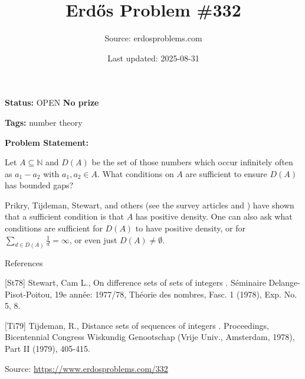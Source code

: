 \documentclass{article}
\title{Erd\H{o}s Problem \#332}
\date{Last updated: 2025-08-31}
\author{Source: erdosproblems.com}
\begin{document}
\maketitle

\noindent\textbf{Status:} OPEN \quad \textbf{No prize}

\noindent\textbf{Tags:} number theory

\medskip

\noindent\textbf{Problem Statement:}

Let $A\subseteq \mathbb{N}$ and $D(A)$ be the set of those numbers which occur infinitely often as $a_1-a_2$ with $a_1,a_2\in A$. What conditions on $A$ are sufficient to ensure $D(A)$ has bounded gaps?




Prikry, Tijdeman, Stewart, and others (see the survey articles \cite{St78} and \cite{Ti79}) have shown that a sufficient condition is that $A$ has positive density. One can also ask what conditions are sufficient for $D(A)$ to have positive density, or for $\sum_{d\in D(A)}\frac{1}{d}=\infty$, or even just $D(A)\neq\emptyset$.




References

[St78] Stewart, Cam L., On difference sets of sets of integers . S\'{e}minaire Delange-Pisot-Poitou, 19e ann\'{e}e: 1977/78, Th\'{e}orie des nombres, Fasc. 1 (1978), Exp. No. 5, 8.

[Ti79] Tijdeman, R., Distance sets of sequences of integers . Proceedings, Bicentennial Congress Wiskundig Genootschap (Vrije Univ., Amsterdam, 1978), Part II (1979), 405-415.


\bigskip
\noindent\small{Source: \url{https://www.erdosproblems.com/332}}
\end{document}
